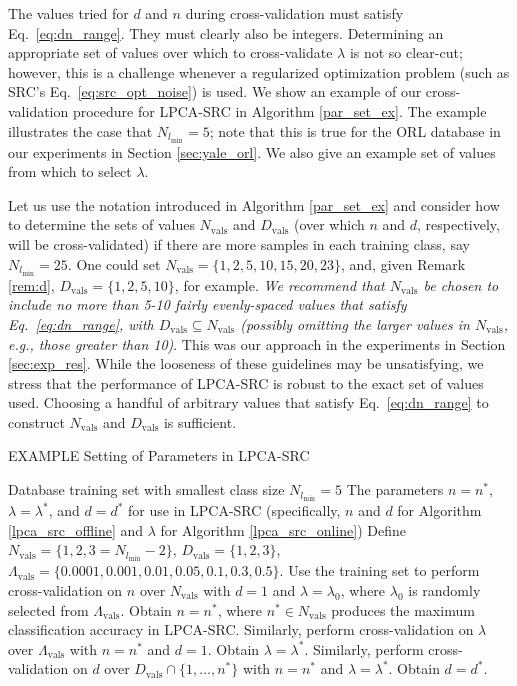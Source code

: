 \documentclass[review]{elsarticle}
\begin{document}
The values tried for $d$ and $n$ during cross-validation must satisfy Eq.~\eqref{eq:dn_range}. They must clearly also be integers. Determining an appropriate set of values over which to cross-validate $\lambda$ is not so clear-cut; however, this is a challenge whenever a regularized optimization problem (such as SRC's Eq.~\eqref{eq:src_opt_noise}) is used. We show an example of our cross-validation procedure for LPCA-SRC in Algorithm \ref{par_set_ex}. The example illustrates the case that $N_{l_{\mathrm{min}}} = 5$; note that this is true for the ORL database in our experiments in Section \ref{sec:yale_orl}. We also give an example set of values from which to select $\lambda$.

Let us use the notation introduced in Algorithm \ref{par_set_ex} and consider how to determine the sets of values $N_\mathrm{vals}$ and $D_\mathrm{vals}$ (over which $n$ and $d$, respectively, will be cross-validated) if there are more samples in each training class, say $N_{l_{\mathrm{min}}} = 25$. One could set $N_\mathrm{vals} = \{1,2,5,10,15,20,23\}$, and, given Remark \ref{rem:d}, $D_\mathrm{vals} = \{1,2,5,10\}$, for example. \emph{We recommend that $N_\mathrm{vals}$ be chosen to include no more than 5-10 fairly evenly-spaced values that satisfy Eq.~\eqref{eq:dn_range}, with $D_\mathrm{vals} \subseteq N_\mathrm{vals}$ (possibly omitting the larger values in $N_\mathrm{vals}$, e.g., those greater than 10)}. This was our approach in the experiments in Section \ref{sec:exp_res}. While the looseness of these guidelines may be unsatisfying, we stress that the performance of LPCA-SRC is robust to the exact set of values used. Choosing a handful of arbitrary values that satisfy Eq.~\eqref{eq:dn_range} to construct $N_\mathrm{vals}$ and $D_\mathrm{vals}$ is sufficient. 






\begin{algorithm}
\caption{EXAMPLE Setting of Parameters in LPCA-SRC}
\label{par_set_ex} 
\begin{algorithmic}[1]
\REQUIRE Database training set with smallest class size $N_{l_{\mathrm{min}}} = 5$
\ENSURE The parameters $n=n^*$, $\lambda = \lambda^*$, and $d=d^*$ for use in LPCA-SRC (specifically, $n$ and $d$ for Algorithm \ref{lpca_src_offline} and $\lambda$ for Algorithm \ref{lpca_src_online})
\STATE Define $N_\mathrm{vals} = \{1,2,3=N_{l_{\mathrm{min}}}-2\}$, $D_\mathrm{vals} = \{1,2,3\}$, $\Lambda_\mathrm{vals} = \{0.0001, 0.001,0.01,0.05,0.1,0.3,0.5\}$. 
\STATE Use the training set to perform cross-validation on $n$ over $N_\mathrm{vals}$ with $d=1$ and $\lambda = \lambda_0$, where $\lambda_0$ is randomly selected from $\Lambda_\mathrm{vals}$. Obtain $n = n^*$, where $n^* \in N_\mathrm{vals}$ produces the maximum classification accuracy in LPCA-SRC.
\STATE Similarly, perform cross-validation on $\lambda$ over $\Lambda_{\mathrm{vals}}$ with $n=n^*$ and $d=1$. Obtain $\lambda = \lambda^*$.
\STATE Similarly, perform cross-validation on $d$ over $D_{\mathrm{vals}} \cap \{1,\ldots,n^*\}$ with $n=n^*$ and $\lambda = \lambda^*$. Obtain $d = d^*$.
\end{algorithmic}
\end{algorithm}
\end{document}

